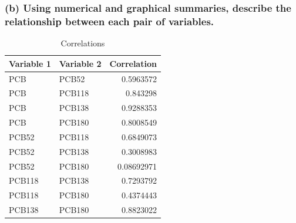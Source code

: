 \documentclass[11pt]{article}
\begin{document}
\subsubsection*{(b) Using numerical and graphical summaries, describe the relationship between each pair of variables.}
\label{sec:orge0e174d}
\begin{table}[htbp]
\caption{Correlations}
\centering
\begin{tabular}{llr}
Variable 1 & Variable 2 & Correlation\\
\hline
PCB & PCB52 & 0.5963572\\
PCB & PCB118 & 0.843298\\
PCB & PCB138 & 0.9288353\\
PCB & PCB180 & 0.8008549\\
PCB52 & PCB118 & 0.6849073\\
PCB52 & PCB138 & 0.3008983\\
PCB52 & PCB180 & 0.08692971\\
PCB118 & PCB138 & 0.7293792\\
PCB118 & PCB180 & 0.4374443\\
PCB138 & PCB180 & 0.8823022\\
\end{tabular}
\end{table}
\end{document}
